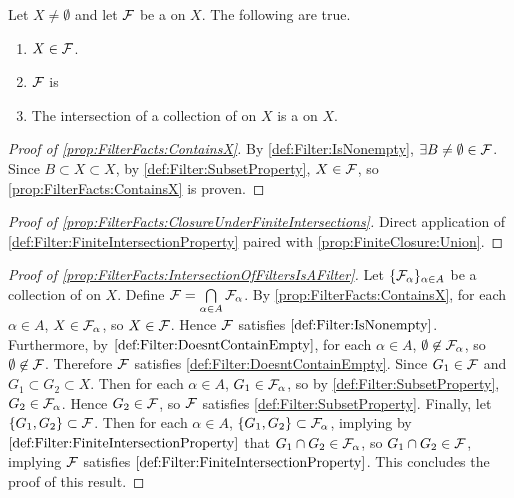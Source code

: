 \begin{prop}
\label{prop:FilterFacts}
    Let $X \neq \emptyset$ and let $\mathcal{F}$ be a 
    \Filter on $X$. The following are true. 
    \begin{enumerate}[label=(\roman*), ref={\ref{prop:FilterFacts}~\roman*}]
        \item \label{prop:FilterFacts:ContainsX} $X \in \mathcal{F}$. 
        \item \label{prop:FilterFacts:ClosureUnderFiniteIntersections} $\mathcal{F}$ is \ClosedUnderFiniteIntersections
        \item \label{prop:FilterFacts:IntersectionOfFiltersIsAFilter} The intersection of a collection of \Filters on $X$ is a \Filter on $X$. 
    \end{enumerate}
    \begin{proof}[Proof of \ref{prop:FilterFacts:ContainsX}]
        By \ref{def:Filter:IsNonempty}, 
        $\exists B \neq \emptyset \in \mathcal{F}$. 
        Since $B \subset X \subset X$, by 
        \ref{def:Filter:SubsetProperty}, 
        $X \in \mathcal{F}$, so \ref{prop:FilterFacts:ContainsX} is proven. 
    \end{proof}
    \begin{proof}[Proof of \ref{prop:FilterFacts:ClosureUnderFiniteIntersections}]
        Direct application of \ref{def:Filter:FiniteIntersectionProperty} paired with 
        \ref{prop:FiniteClosure:Union}.
    \end{proof}
    \begin{proof}[Proof of \ref{prop:FilterFacts:IntersectionOfFiltersIsAFilter}]
        Let $\{\mathcal{F}_\alpha\}_{\alpha \in A}$ be a collection of \Filters on $X$. 
        Define $\mathcal{F}=\bigcap\limits_{\alpha \in A} \mathcal{F}_\alpha$. 
        By \ref{prop:FilterFacts:ContainsX}, for each $\alpha \in A$, 
        $X \in \mathcal{F}_\alpha$, so $X \in \mathcal{F}$.
        Hence $\mathcal{F}$ satisfies $\ref{def:Filter:IsNonempty}$.
        Furthermore, by $\ref{def:Filter:DoesntContainEmpty}$, for each 
        $\alpha \in A$, $\emptyset \not \in \mathcal{F}_\alpha$, so 
        $\emptyset \not \in \mathcal{F}$. Therefore $\mathcal{F}$ satisfies \ref{def:Filter:DoesntContainEmpty}.
        Since $G_1 \in \mathcal{F}$ and $G_1 \subset G_2 \subset X$. 
        Then for each $\alpha \in A$, $G_1 \in \mathcal{F}_\alpha$, so by 
        \ref{def:Filter:SubsetProperty}, $G_2 \in \mathcal{F}_\alpha$.
        Hence $G_2 \in \mathcal{F}$, so $\mathcal{F}$ satisfies \ref{def:Filter:SubsetProperty}. 
        Finally, let $\{G_1,G_2\} \subset \mathcal{F}$. 
        Then for each $\alpha \in A$, $\{G_1,G_2\} \subset \mathcal{F}_\alpha$, 
        implying by $\ref{def:Filter:FiniteIntersectionProperty}$ that 
        $G_1 \cap G_2 \in \mathcal{F}_\alpha$, so $G_1\cap G_2 \in \mathcal{F}$, 
        implying $\mathcal{F}$ satisfies $\ref{def:Filter:FiniteIntersectionProperty}$. 
        This concludes the proof of this result. 
    \end{proof}
    
\end{prop}


